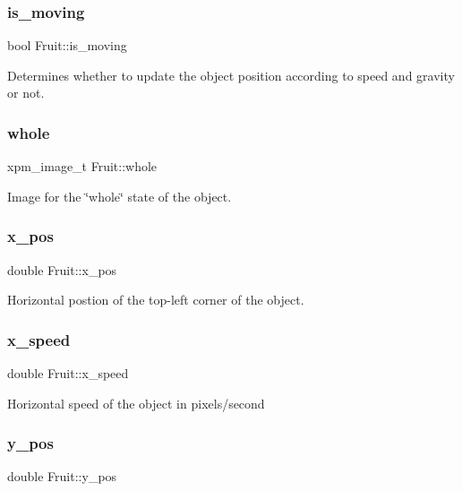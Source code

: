 \subsubsection{\texorpdfstring{is\+\_\+moving}{is\_moving}}
{\footnotesize\ttfamily bool Fruit\+::is\+\_\+moving}

Determines whether to update the object position according to speed and gravity or not. \mbox{\label{structFruit_af2d21891aa444872c85b5477b063b0ff}} 
\subsubsection{\texorpdfstring{whole}{whole}}
{\footnotesize\ttfamily xpm\+\_\+image\+\_\+t Fruit\+::whole}

Image for the \char`\"{}whole\char`\"{} state of the object. \mbox{\label{structFruit_a1b9c77d333911293a2c7ae9417608b40}} 
\subsubsection{\texorpdfstring{x\+\_\+pos}{x\_pos}}
{\footnotesize\ttfamily double Fruit\+::x\+\_\+pos}

Horizontal postion of the top-\/left corner of the object. \mbox{\label{structFruit_a581a41a384b918c8c18116afc954d398}} 
\subsubsection{\texorpdfstring{x\+\_\+speed}{x\_speed}}
{\footnotesize\ttfamily double Fruit\+::x\+\_\+speed}

Horizontal speed of the object in pixels/second \mbox{\label{structFruit_a569ebecee6a70958b552463a89e106ba}} 
\subsubsection{\texorpdfstring{y\+\_\+pos}{y\_pos}}
{\footnotesize\ttfamily double Fruit\+::y\+\_\+pos}

